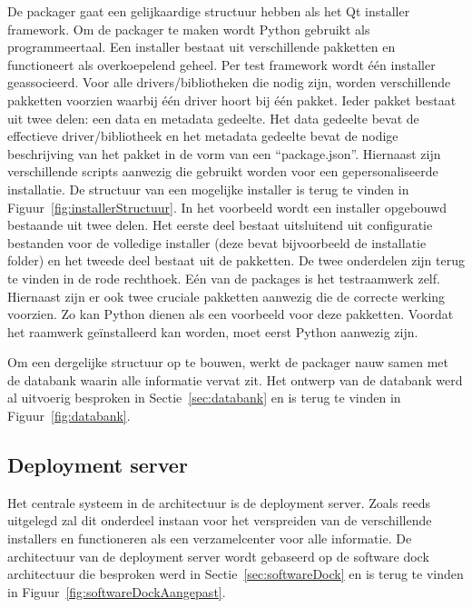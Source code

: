 De packager gaat een gelijkaardige structuur hebben als het Qt installer framework.
Om de packager te maken wordt Python gebruikt als programmeertaal.
Een installer bestaat uit verschillende pakketten en functioneert als overkoepelend geheel.
Per test framework wordt één installer geassocieerd.
Voor alle drivers/bibliotheken die nodig zijn, worden verschillende pakketten voorzien waarbij één driver hoort bij één pakket.
Ieder pakket bestaat uit twee delen: een data en metadata gedeelte.
Het data gedeelte bevat de effectieve driver/bibliotheek en het metadata gedeelte bevat de nodige beschrijving van het pakket in de vorm van een ``package.json''.
Hiernaast zijn verschillende scripts aanwezig die gebruikt worden voor een gepersonaliseerde installatie.
De structuur van een mogelijke installer is terug te vinden in Figuur~\vref{fig:installerStructuur}.
In het voorbeeld wordt een installer opgebouwd bestaande uit twee delen.
Het eerste deel bestaat uitsluitend uit configuratie bestanden voor de volledige installer (deze bevat bijvoorbeeld de installatie folder) en het tweede deel bestaat uit de pakketten.
De twee onderdelen zijn terug te vinden in de rode rechthoek.
Eén van de packages is het testraamwerk zelf.
Hiernaast zijn er ook twee cruciale pakketten aanwezig die de correcte werking voorzien.
Zo kan Python dienen als een voorbeeld voor deze pakketten.
Voordat het raamwerk geïnstalleerd kan worden, moet eerst Python aanwezig zijn.

Om een dergelijke structuur op te bouwen, werkt de packager nauw samen met de databank waarin alle informatie vervat zit.
Het ontwerp van de databank werd al uitvoerig besproken in Sectie~\ref{sec:databank} en is terug te vinden in Figuur~\ref{fig:databank}.

\subsection{Deployment server}
Het centrale systeem in de architectuur is de deployment server.
Zoals reeds uitgelegd zal dit onderdeel instaan voor het verspreiden van de verschillende installers en functioneren als een verzamelcenter voor alle informatie.
De architectuur van de deployment server wordt gebaseerd op de software dock architectuur die besproken werd in Sectie~\vref{sec:softwareDock} en is terug te vinden in Figuur~\vref{fig:softwareDockAangepast}.

